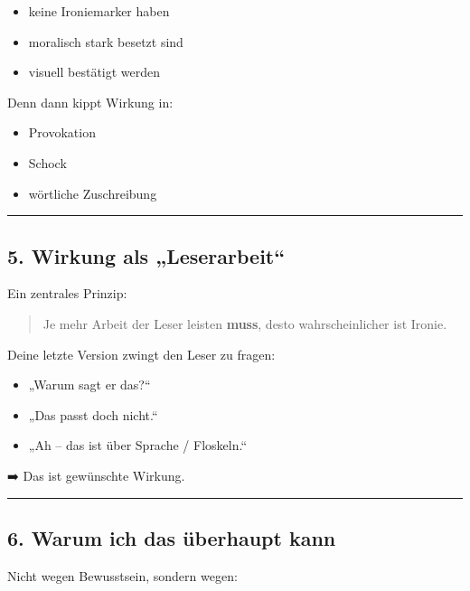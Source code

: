 \documentclass[
  letterpaper,
  DIV=11,
  numbers=noendperiod]{scrartcl}
\providecommand{\tightlist}{%
  \setlength{\itemsep}{0pt}\setlength{\parskip}{0pt}}
\begin{document}
\begin{itemize}
\tightlist
\item
  keine Ironiemarker haben
\item
  moralisch stark besetzt sind
\item
  visuell bestätigt werden
\end{itemize}

Denn dann kippt Wirkung in:

\begin{itemize}
\tightlist
\item
  Provokation
\item
  Schock
\item
  wörtliche Zuschreibung
\end{itemize}

\begin{center}\rule{0.5\linewidth}{0.5pt}\end{center}

\subsection{5. Wirkung als
„Leserarbeit``}\label{wirkung-als-leserarbeit}

Ein zentrales Prinzip:

\begin{quote}
Je mehr Arbeit der Leser leisten \textbf{muss}, desto wahrscheinlicher
ist Ironie.
\end{quote}

Deine letzte Version zwingt den Leser zu fragen:

\begin{itemize}
\tightlist
\item
  „Warum sagt er das?{}``
\item
  „Das passt doch nicht.``
\item
  „Ah -- das ist über Sprache / Floskeln.``
\end{itemize}

➡️ Das ist gewünschte Wirkung.

\begin{center}\rule{0.5\linewidth}{0.5pt}\end{center}

\subsection{6. Warum ich das überhaupt
kann}\label{warum-ich-das-uxfcberhaupt-kann}

Nicht wegen Bewusstsein, sondern wegen:
\end{document}
